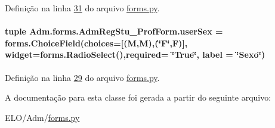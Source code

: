 Definição na linha \hyperlink{Adm_2forms_8py_source_l00031}{31} do arquivo \hyperlink{Adm_2forms_8py_source}{forms.\+py}.

\hypertarget{classAdm_1_1forms_1_1AdmRegStu__ProfForm_af8e16ffbc31dfdec8496b7751bb51bed}{}
\paragraph[{user\+Sex}]{\setlength{\rightskip}{0pt plus 5cm}tuple Adm.\+forms.\+Adm\+Reg\+Stu\+\_\+\+Prof\+Form.\+user\+Sex = forms.\+Choice\+Field(choices=\mbox{[}(\textquotesingle{}M\textquotesingle{},\textquotesingle{}M\textquotesingle{}),(\char`\"{}F\char`\"{},\textquotesingle{}F\textquotesingle{})\mbox{]}, widget=forms.\+Radio\+Select(),required= \char`\"{}True\char`\"{}, label = \char`\"{}Sexo\char`\"{})\hspace{0.3cm}{\ttfamily [static]}}\label{classAdm_1_1forms_1_1AdmRegStu__ProfForm_af8e16ffbc31dfdec8496b7751bb51bed}


Definição na linha \hyperlink{Adm_2forms_8py_source_l00029}{29} do arquivo \hyperlink{Adm_2forms_8py_source}{forms.\+py}.



A documentação para esta classe foi gerada a partir do seguinte arquivo\+:\begin{DoxyCompactItemize}
\item 
E\+L\+O/\+Adm/\hyperlink{Adm_2forms_8py}{forms.\+py}\end{DoxyCompactItemize}
